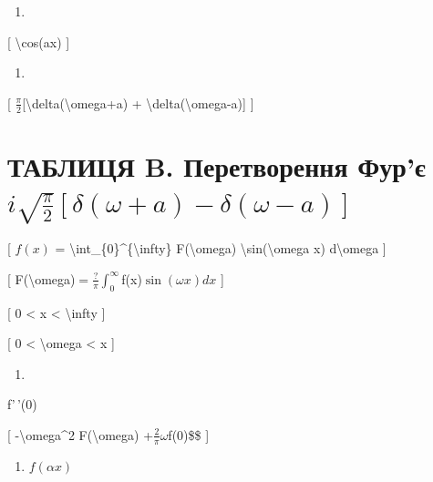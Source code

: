 \documentclass[
]{article}
\providecommand{\tightlist}{%
  \setlength{\itemsep}{0pt}\setlength{\parskip}{0pt}}
\begin{document}
{{{\begin{enumerate}
\def\labelenumi{\arabic{enumi}.}
\setcounter{enumi}{18}
\tightlist
\item
\end{enumerate}

{[} \textbackslash cos(ax) {]}

\begin{enumerate}
\def\labelenumi{\arabic{enumi}.}
\setcounter{enumi}{9}
\tightlist
\item
\end{enumerate}

{[} \(\frac{\pi}{2}\){[}\textbackslash delta(\textbackslash omega+a) +
\textbackslash delta(\textbackslash omega-a){]} {]}

\section{\texorpdfstring{ТАБЛИЦЯ B. Перетворення Фур'є
\(i \sqrt{\frac{\pi}{2}} [\delta(\omega+a) - \delta(\omega-a)]\)}{ТАБЛИЦЯ B. Перетворення Фур'є i \textbackslash sqrt\{\textbackslash frac\{\textbackslash pi\}\{2\}\} {[}\textbackslash delta(\textbackslash omega+a) - \textbackslash delta(\textbackslash omega-a){]}}}\label{ux442ux430ux431ux43bux438ux446ux44f-b.-ux43fux435ux440ux435ux442ux432ux43eux440ux435ux43dux43dux44f-ux444ux443ux440ux454-i-sqrtfracpi2-deltaomegaa---deltaomega-a}

{[} \(f(x)\) = \textbackslash int\_\{0\}\^{}\{\textbackslash infty\}
F(\textbackslash omega) \textbackslash sin(\textbackslash omega x)
d\textbackslash omega {]}

{[}
F(\textbackslash omega)\(= \frac{?}{\pi} \int_{0}^{\infty}\)f(x)\(\sin(\omega x) dx\)
{]}

{[} 0 \textless{} x \textless{} \textbackslash infty {]}

{[} 0 \textless{} \textbackslash omega \textless{} x {]}

\begin{enumerate}
\def\labelenumi{\arabic{enumi}.}
\tightlist
\item
\end{enumerate}

f'\,'(0)

{[} -\textbackslash omega\^{}2 F(\textbackslash omega)
+\(\frac{2}{\pi} \omega\)f(0)\$\$ {]}

\begin{enumerate}
\def\labelenumi{\arabic{enumi}.}
\setcounter{enumi}{1}
\tightlist
\item
  \(f(\alpha x)\)
\end{enumerate}

}}}
\end{document}
